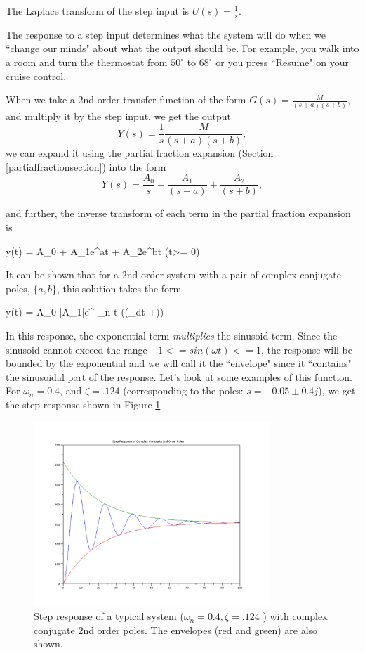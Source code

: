 The Laplace transform of the step input is $U(s) = \frac{1}{s}$.

The response to  a step input determines what the system will do when we ``change our minds" about what the output should be.  For example, you walk into a room and turn the thermostat from $50^\circ$ to $68^\circ$ or you press ``Resume" on your cruise control.


When we take a 2nd order transfer function of the form $G(s) = \frac{M}{(s+a)(s+b)}$, and multiply it by the step input, we get the output
\[
Y(s) = \frac{1}{s}\frac{M}{(s+a)(s+b)},
\]
we can expand it using the partial fraction expansion (Section \ref{partialfractionsection}) into the form
\[
Y(s) = \frac{A_0}{s} + \frac{A_1}{(s+a)}+  \frac{A_2}{(s+b)},
\]

and further,  the inverse transform of each term in the partial fraction expansion is

\bq\label{dampedexponentialsolution}
y(t) = A_0 +  A_1e^{at} + A_2e^{bt}   \qquad (t>= 0)
\eq

It can be shown that for a 2nd order system with a pair of complex conjugate poles, $\{a,b\}$, this solution takes the form

\bq\label{eqnDampedSinStep}
y(t) = A_0-|A_1|e^{-\zeta\omega_n t} (\cos({\omega_dt +\phi}))
\eq

In this response, the exponential term {\it multiplies } the sinusoid term.  Since the sinusoid cannot exceed the range $-1<=sin(\omega t)<=1$, the response will be bounded by the exponential and we will call it the ``envelope" since it ``contains" the sinusoidal part of the response.
Let's look at some examples of this function.  For $\omega_n = 0.4$, and $\zeta=.124$ (corresponding to the poles: $s = -0.05\pm0.4j$), we get the step response shown in Figure \ref{typicalstep}



\begin{figure}\centering
\includegraphics[width=3.5in]{figs05/typical_stepa.png}
\caption{Step response of a typical system ($\omega_n = 0.4, \zeta=.124$ ) with complex conjugate 2nd order poles. The envelopes (red and green) are also shown.}\label{typicalstep}
\end{figure}



